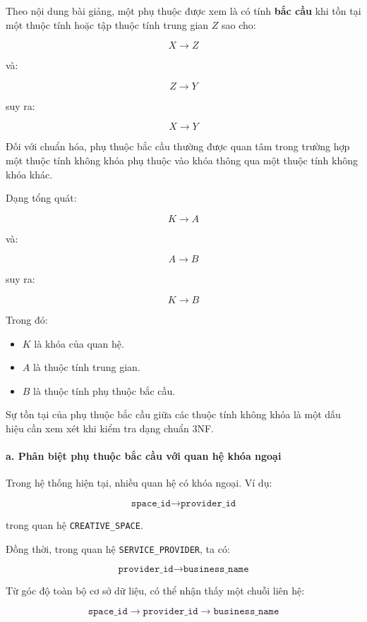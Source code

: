 Theo nội dung bài giảng, một phụ thuộc được xem là có tính \textbf{bắc cầu} khi tồn tại một thuộc tính hoặc tập thuộc tính trung gian $Z$ sao cho:

$$X \rightarrow Z$$

và:

$$Z \rightarrow Y$$

suy ra:

$$X \rightarrow Y$$

Đối với chuẩn hóa, phụ thuộc bắc cầu thường được quan tâm trong trường hợp một thuộc tính không khóa phụ thuộc vào khóa thông qua một thuộc tính không khóa khác.

Dạng tổng quát:

$$K \rightarrow A$$

và:

$$A \rightarrow B$$

suy ra:

$$K \rightarrow B$$

Trong đó:

\begin{itemize}
\item $K$ là khóa của quan hệ.
\item $A$ là thuộc tính trung gian.
\item $B$ là thuộc tính phụ thuộc bắc cầu.
\end{itemize}

Sự tồn tại của phụ thuộc bắc cầu giữa các thuộc tính không khóa là một dấu hiệu cần xem xét khi kiểm tra dạng chuẩn 3NF.

\paragraph{a. Phân biệt phụ thuộc bắc cầu với quan hệ khóa ngoại}\mbox{}\par

Trong hệ thống hiện tại, nhiều quan hệ có khóa ngoại. Ví dụ:

$$
\texttt{space\_id}
\rightarrow
\texttt{provider\_id}
$$

trong quan hệ \texttt{CREATIVE\_SPACE}.

Đồng thời, trong quan hệ \texttt{SERVICE\_PROVIDER}, ta có:

$$
\texttt{provider\_id}
\rightarrow
\texttt{business\_name}
$$

Từ góc độ toàn bộ cơ sở dữ liệu, có thể nhận thấy một chuỗi liên hệ:

$$
\texttt{space\_id}
\rightarrow
\texttt{provider\_id}
\rightarrow
\texttt{business\_name}
$$

